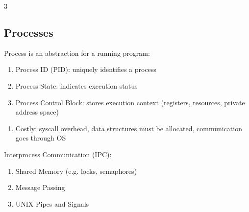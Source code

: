 \documentclass[12pt, a4paper]{article}
\begin{document}
\begin{multicols*}{3}
\subsection{Processes}
Process is an abstraction for a running program:
\begin{enumerate}[\roman*.]
  \item Process ID (PID): uniquely identifies a process 
  \item Process State: indicates execution status
  \item Process Control Block: stores execution context (registers, resources, private address space)
\end{enumerate}
\begin{enumerate}[$-$]\vspace{-2pt}
  \item Costly: syscall overhead, data structures must be allocated, communication goes through OS
\end{enumerate}\vspace{-1pt}
{\centering
\par}
Interprocess Communication (IPC):
\begin{enumerate}[\roman*.]
  \item Shared Memory (e.g. locks, semaphores)
  \item Message Passing 
  \item UNIX Pipes and Signals
\end{enumerate}
\colbreak


\end{multicols*}
\end{document}
